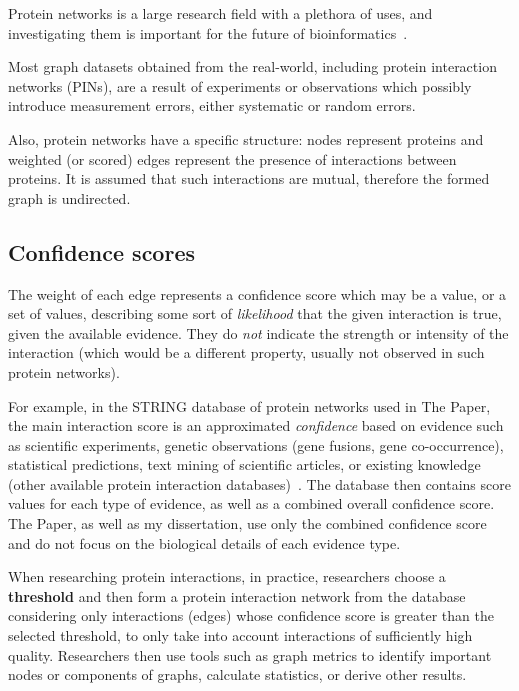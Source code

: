 Protein networks is a large research field with a plethora of uses, and investigating them is important for the future of bioinformatics~.

Most graph datasets obtained from the real-world, including protein interaction networks (PINs), are a result of experiments or observations which possibly introduce measurement errors, either systematic or random errors.

Also, protein networks have a specific structure: nodes represent proteins and weighted (or scored) edges represent the presence of interactions between proteins.
It is assumed that such interactions are mutual, therefore the formed graph is undirected.



\subsection{Confidence scores}

The weight of each edge represents a confidence score which may be a value, or a set of values, describing some sort of \textsl{likelihood} that the given interaction is true, given the available evidence.
They do \textsl{not} indicate the strength or intensity of the interaction (which would be a different property, usually not observed in such protein networks).

For example, in the STRING database of protein networks used in The Paper, the main interaction score is an approximated \textsl{confidence} based on evidence such as scientific experiments, genetic observations (gene fusions, gene co-occurrence), statistical predictions, text mining of scientific articles, or existing knowledge (other available protein interaction databases)~\cite{Szklarczyk2019}.
The database then contains score values for each type of evidence, as well as a combined overall confidence score.
The Paper, as well as my dissertation, use only the combined confidence score and do not focus on the biological details of each evidence type.



When researching protein interactions, in practice, researchers choose a \textbf{threshold} and then form a protein interaction network from the database considering only interactions (edges) whose confidence score is greater than the selected threshold, to only take into account interactions of sufficiently high quality.
Researchers then use tools such as graph metrics to identify important nodes or components of graphs, calculate statistics, or derive other results.


